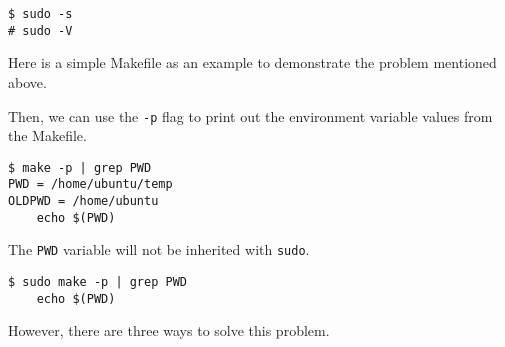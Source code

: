 \documentclass[10pt, oneside]{book}
\begin{document}
\begin{verbatim}
$ sudo -s
# sudo -V
\end{verbatim}

Here is a simple Makefile as an example to demonstrate the problem mentioned above.


Then, we can use the \verb|-p| flag to print out the environment variable values from the Makefile.

\begin{verbatim}
$ make -p | grep PWD
PWD = /home/ubuntu/temp
OLDPWD = /home/ubuntu
	echo $(PWD)
\end{verbatim}

The \verb|PWD| variable will not be inherited with \verb|sudo|.

\begin{verbatim}
$ sudo make -p | grep PWD
	echo $(PWD)
\end{verbatim}

However, there are three ways to solve this problem.
\end{document}
